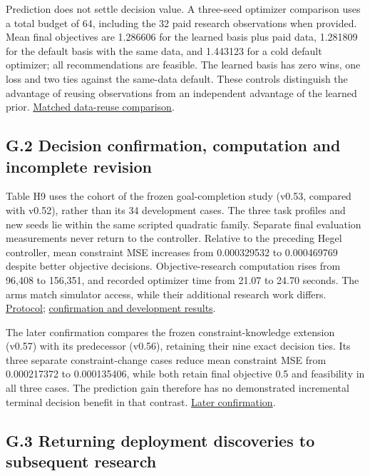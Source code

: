\documentclass[11pt,a4paper]{article}
\begin{document}
Prediction does not settle decision value. A three-seed optimizer comparison
uses a total budget of 64, including the 32 paid research observations when
provided. Mean final objectives are 1.286606 for the learned basis plus paid
data, 1.281809 for the default basis with the same data, and 1.443123 for a
cold default optimizer; all recommendations are feasible. The learned basis
has zero wins, one loss and two ties against the same-data default. These
controls distinguish the advantage of reusing observations from an independent
advantage of the learned prior.
\hyperlink{artifact-158}{Matched data-reuse comparison}.


\subsection*{G.2 Decision confirmation, computation and incomplete revision}

Table H9 uses the  cohort of the frozen goal-completion
study (v0.53, compared with v0.52), rather than its 34 development cases. The three task profiles and new
seeds lie within the same scripted quadratic family. Separate final evaluation
measurements never return to the controller. Relative to the preceding Hegel
controller, mean constraint MSE increases from 0.000329532 to 0.000469769 despite
better objective decisions. Objective-research computation rises from 96,408 to
156,351, and recorded optimizer time from 21.07 to 24.70 seconds. The arms match
simulator access, while their additional research work differs.
\hyperlink{artifact-159}{Protocol};
\hyperlink{artifact-160}{confirmation and development results}.


The later confirmation compares the frozen constraint-knowledge extension
(v0.57) with its predecessor (v0.56), retaining their nine exact decision ties.
Its three separate constraint-change cases reduce mean constraint MSE from
0.000217372 to 0.000135406, while both retain final objective 0.5 and feasibility
in all three cases. The prediction gain therefore has no demonstrated incremental
terminal decision benefit in that contrast.
\hyperlink{artifact-161}{Later confirmation}.


\subsection*{G.3 Returning deployment discoveries to subsequent research}
\end{document}
